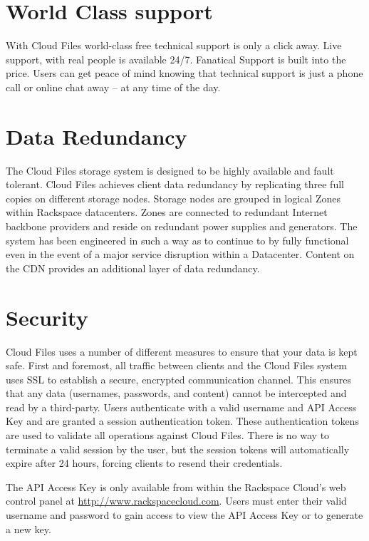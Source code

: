 \documentclass[letterpaper,10pt,english]{manual}
\begin{document}
\section{World Class support}

With Cloud Files world-class free technical support is only a click away.
Live support, with real people is available 24/7.  Fanatical Support is
built into the price. Users can get peace of mind knowing that technical
support is just a phone call or online chat away – at any time of the day.


\section{Data Redundancy}

The Cloud Files storage system is designed to be highly available and
fault tolerant.  Cloud Files achieves client data redundancy by
replicating three full copies on different storage nodes.  Storage nodes
are grouped in logical Zones within Rackspace datacenters.  Zones are
connected to redundant Internet backbone providers and reside on redundant
power supplies and generators.  The system has been engineered in such
a way as to continue to by fully functional even in the event of a major
service disruption within a Datacenter. Content on the CDN provides an
additional layer of data redundancy.


\section{Security}

Cloud Files uses a number of different measures to ensure that your data
is kept safe. First and foremost, all traffic between clients and the
Cloud Files system uses SSL to establish a secure, encrypted communication
channel. This ensures that any data (usernames, passwords, and content)
cannot be intercepted and read by a third-party.  Users authenticate with
a valid username and API Access Key and are granted a session authentication
token. These authentication tokens are used to validate all operations
against Cloud Files. There is no way to terminate a valid session by the
user, but the session tokens will automatically expire after 24 hours,
forcing clients to resend their credentials.

The API Access Key is only available from within the Rackspace Cloud’s web
control panel at \href{http://www.rackspacecloud.com}{http://www.rackspacecloud.com}.  Users must enter their valid
username and password to gain access to view the API Access Key or to
generate a new key.
\end{document}
